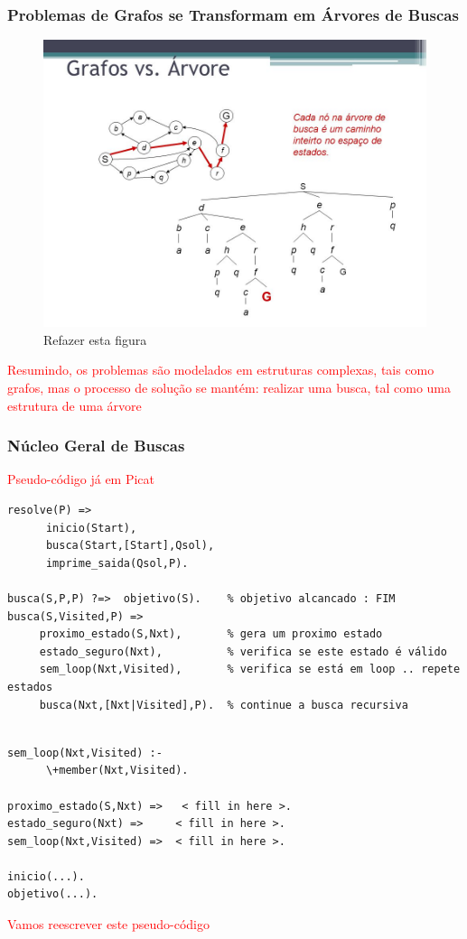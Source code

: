 \begin{frame}[fragile]
\frametitle{Problemas de Grafos se Transformam em Árvores de Buscas}

\begin{figure}[!htb]
\centering
\includegraphics[width=.8\textwidth, height=0.67\textheight]{figures/grafo-arvore-busca.jpg}
\caption{Refazer esta figura}
\end{figure}

\textcolor{red}{Resumindo, os problemas são modelados  em 
estruturas  complexas, tais como grafos, mas o processo de solução
se mantém: realizar uma busca, tal como uma estrutura de uma árvore }

\end{frame}




\begin{frame}[fragile, allowframebreaks=0.9]
  \frametitle{Núcleo Geral de Buscas}

\textcolor{red}{Pseudo-código já em Picat}

\begin{verbatim}
resolve(P) =>
      inicio(Start),
      busca(Start,[Start],Qsol),
      imprime_saida(Qsol,P).

busca(S,P,P) ?=>  objetivo(S).    % objetivo alcancado : FIM    
busca(S,Visited,P) =>
     proximo_estado(S,Nxt),       % gera um proximo estado  
     estado_seguro(Nxt),          % verifica se este estado é válido 
     sem_loop(Nxt,Visited),       % verifica se está em loop .. repete estados 
     busca(Nxt,[Nxt|Visited],P).  % continue a busca recursiva 
\end{verbatim}


\framebreak


\begin{verbatim}

sem_loop(Nxt,Visited) :-
      \+member(Nxt,Visited).

proximo_estado(S,Nxt) =>   < fill in here >.
estado_seguro(Nxt) =>     < fill in here >.
sem_loop(Nxt,Visited) =>  < fill in here >.     
                       
inicio(...).
objetivo(...).

\end{verbatim}


\textcolor{red}{Vamos reescrever este pseudo-código}


\end{frame}


